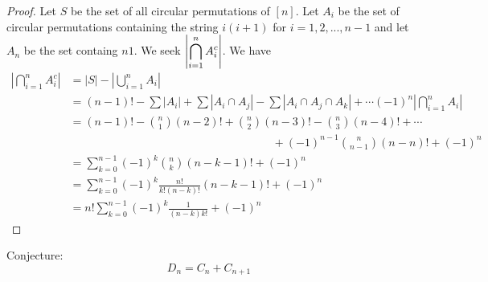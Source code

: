 \documentclass[handout]{ximera}
\begin{document}
\begin{proof}
Let $S$ be the set of all circular permutations of $[n]$. Let $A_i$ be the set of circular permutations 
containing the string $i(i+1)$ for $i = 1, 2, ..., n-1$
and let $A_n$ be the set containg $n1$. We seek $\displaystyle \left|\bigcap_{i=1}^n A_i^c\right|$. We have
\begin{align*}
\left|\bigcap_{i=1}^n A_i^c\right| &= |S| - \left|\bigcup_{i=1}^n A_i\right|\\
&= (n-1)! - \sum |A_i| + \sum |A_i \cap A_j| - \sum |A_i \cap A_j \cap A_k| + \cdots (-1)^n \left|\bigcap_{i=1}^n A_i\right|\\
&= (n-1)! - \binom{n}{1} (n-2)! + \binom{n}{2} (n-3)! - \binom{n}{3} (n-4)! + \cdots \\
 & \qquad \qquad\qquad\qquad\qquad\qquad\qquad\qquad\qquad+ (-1)^{n-1} \binom{n}{n-1} (n-n)! + (-1)^n\\
&= \sum_{k=0}^{n-1} (-1)^k \binom{n}{k} (n-k-1)! + (-1)^n\\
&= \sum_{k=0}^{n-1} (-1)^k \frac{n!}{k!(n-k)!} (n-k-1)! + (-1)^n\\
&= n! \sum_{k=0}^{n-1} (-1)^k \frac{1}{(n-k) k!} + (-1)^n
\end{align*}
\end{proof}


Conjecture:
\[
D_n = C_n + C_{n+1}
\]
\end{document}
